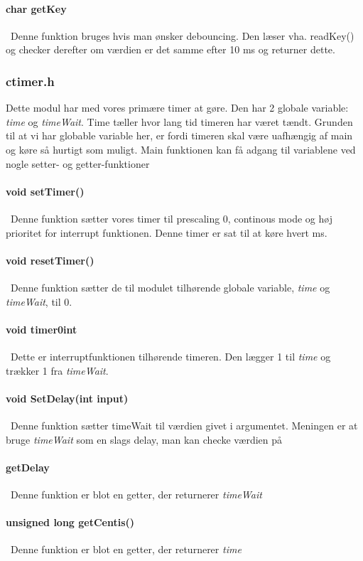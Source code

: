 \paragraph{char getKey}\
Denne funktion bruges hvis man ønsker debouncing. Den læser vha. readKey() og checker derefter om værdien er det samme efter 10 ms og returner dette.
\subsubsection{ctimer.h}
Dette modul har med vores primære timer at gøre. Den har 2 globale variable: \textit{time} og \textit{timeWait}. Time tæller hvor lang tid timeren har været tændt. Grunden til at vi har globable variable her, er fordi timeren skal være uafhængig af main og køre så hurtigt som muligt. Main funktionen kan få adgang til variablene ved nogle setter- og getter-funktioner
\paragraph{void setTimer()}\
Denne funktion sætter vores timer til prescaling 0, continous mode og høj prioritet for interrupt funktionen. Denne timer er sat til at køre hvert ms.
\paragraph{void resetTimer()}\
Denne funktion sætter de til modulet tilhørende globale variable, \textit{time} og \textit{timeWait}, til 0.
\paragraph{void timer0int}\
Dette er interruptfunktionen tilhørende timeren. Den lægger 1 til \textit{time} og trækker 1 fra \textit{timeWait}. 
\paragraph{void SetDelay(int input)}\
Denne funktion sætter timeWait til værdien givet i argumentet. Meningen er at bruge \textit{timeWait} som en slags delay, man kan checke værdien på
\paragraph{getDelay}\
Denne funktion er blot en getter, der returnerer \textit{timeWait}
\paragraph{unsigned long getCentis()}\
Denne funktion er blot en getter, der returnerer \textit{time}
